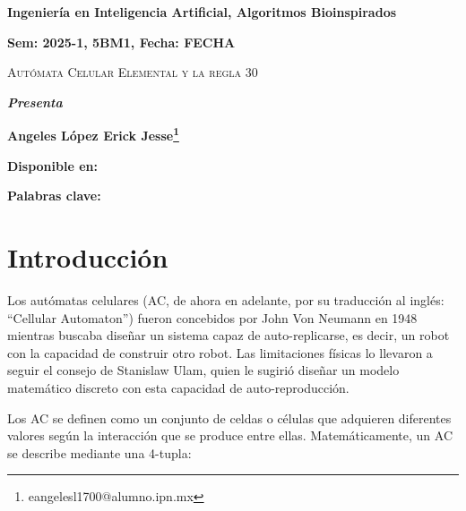 \documentclass[12pt,twoside]{article}
\newcommand{\keywords}[1]{%
	\begin{center}
		\textbf{Palabras clave:} #1
	\end{center}
}
\begin{document}
	
	\centerline{\bf Ingeniería en Inteligencia Artificial, Algoritmos Bioinspirados}
	
	\centerline{\bf  Sem: 2025-1, 5BM1, Fecha: FECHA}
	
	\centerline{}
	
	
	
	\begin{center}
		\Large{\textsc{Autómata Celular Elemental y la regla 30}} 
	\end{center}
	\centerline{}
	\centerline{\bf {\textit{Presenta}}}
	\centerline{\bf {Angeles López Erick Jesse\footnote{eangelesl1700@alumno.ipn.mx}}}
	\centerline{}
	\centerline{}
	\centerline{\bf {Disponible en:}}
	\centerline{}
	
	
	
	
	\newtheorem{Theorem}{\quad Theorem}[section]
	
	\newtheorem{Definition}[Theorem]{\quad Definition}
	
	\newtheorem{Corollary}[Theorem]{\quad Corollary}
	
	\newtheorem{Lemma}[Theorem]{\quad Lemma}
	
	\newtheorem{Example}[Theorem]{\quad Example}
	
	\bigskip
	
	\bigskip
	
	\begin{abstract} 
		
	\end{abstract}
	
	\keywords{}
	
	\clearpage
	
	\tableofcontents
	\clearpage
		
	\section{Introducción}
	
	Los autómatas celulares (AC, de ahora en adelante, por su traducción al inglés: ``Cellular Automaton'') fueron concebidos por John Von Neumann en 1948 mientras buscaba diseñar un sistema capaz de auto-replicarse, es decir, un robot con la capacidad de construir otro robot. Las limitaciones físicas lo llevaron a seguir el consejo de Stanislaw Ulam, quien le sugirió diseñar un modelo matemático discreto con esta capacidad de auto-reproducción.
	
	Los AC se definen como un conjunto de celdas o células que adquieren diferentes valores según la interacción que se produce entre ellas. Matemáticamente, un AC se describe mediante una 4-tupla:
	
\end{document}
